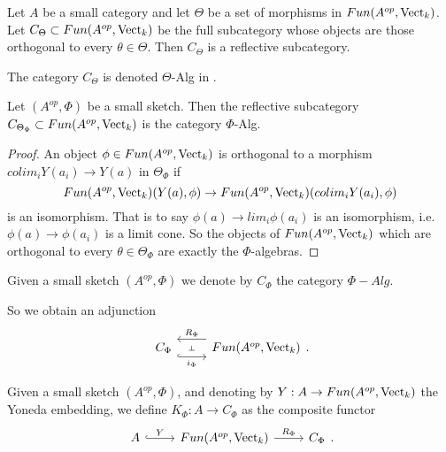 \begin{theorem}\cite[Theorem 6.5]{kelly/basic-concepts-enriched}\label{reflective}

\noindent Let $A$ be a small category and let $\Theta$ be a set of morphisms in $Fun(A^{op},\operatorname{Vect}_k)$. Let $C_{\Theta}\subset Fun(A^{op},\operatorname{Vect}_k)$ be the full subcategory whose objects are those orthogonal to every $\theta\in\Theta$. Then $C_{\Theta}$ is a reflective subcategory.\end{theorem}

\begin{remark}
 The category $C_{\Theta}$ is denoted $\Theta$-Alg in \cite{kelly/basic-concepts-enriched}.\end{remark}


\begin{lemma}\cite[Theorem 6.11]{kelly/basic-concepts-enriched}
 Let $(A^{op},\Phi)$ be a small sketch. Then the reflective subcategory $C_{\Theta_{\Phi}}\subset Fun(A^{op},\operatorname{Vect}_k)$ is the category $\Phi$-Alg.\end{lemma}

 \begin{proof} An object $\phi \in Fun(A^{op},\operatorname{Vect}_k)$ is orthogonal to a morphism $colim_i Y(a_i)\to Y(a)$ in $\Theta_{\Phi}$ if $$Fun(A^{op},\operatorname{Vect}_k)(Y(a),\phi)\to Fun(A^{op},\operatorname{Vect}_k)(colim_i Y(a_i),\phi)$$ is an isomorphism. That is to say $\phi(a)\to lim_i \phi(a_i)$ is an isomorphism, i.e. $\phi(a)\to \phi(a_i)$ is a limit cone. So the objects of $Fun(A^{op},\operatorname{Vect}_k)$ which are orthogonal to every $\theta\in \Theta_{\Phi}$ are exactly the $\Phi$-algebras. \end{proof}

\begin{definition}
Given a small sketch $(A^{op},\Phi)$ we denote by $C_{\Phi}$ the category $\Phi-Alg$.
\end{definition}


So we obtain an adjunction \[\begin{tikzcd}
	{C_{\Phi}} & {Fun(A^{op},\Vect_k)}
	\arrow[""{name=0, anchor=center, inner sep=0}, "i_{\Phi}"', shift right=3, hook, from=1-1, to=1-2]
	\arrow[""{name=1, anchor=center, inner sep=0}, "R_{\Phi}"', shift right=3, from=1-2, to=1-1]
	\arrow["\dashv"{anchor=center, rotate=-90}, draw=none, from=1, to=0]
\end{tikzcd}.\]

\begin{definition} Given a small sketch $(A^{op},\Phi)$, and denoting by $Y:A\to Fun(A^{op},\operatorname{Vect}_k)$ the Yoneda embedding, we define $K_{\Phi}:A\to C_{\Phi}$ as the composite functor \[\begin{tikzcd}
	A & {Fun(A^{op},\Vect_k)} & {C_{\Phi}}
	\arrow["Y", hook, from=1-1, to=1-2]
	\arrow["R_{\Phi}", from=1-2, to=1-3]
\end{tikzcd}.\]\end{definition}

